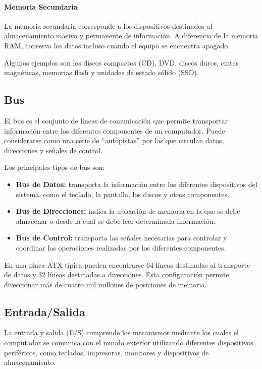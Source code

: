 \documentclass[10pt]{article}
\begin{document}
\paragraph{Memoria Secundaria}

La memoria secundaria corresponde a los dispositivos destinados al almacenamiento masivo y permanente de información. A diferencia de la memoria RAM, conserva los datos incluso cuando el equipo se encuentra apagado.

Algunos ejemplos son los discos compactos (CD), DVD, discos duros, cintas magnéticas, memorias flash y unidades de estado sólido (SSD).

\subsection{Bus}

El bus es el conjunto de líneas de comunicación que permite transportar información entre los diferentes componentes de un computador. Puede considerarse como una serie de ``autopistas'' por las que circulan datos, direcciones y señales de control.

Los principales tipos de bus son:

\begin{itemize}
\item \textbf{Bus de Datos:} transporta la información entre los diferentes dispositivos del sistema, como el teclado, la pantalla, los discos y otros componentes.

\item \textbf{Bus de Direcciones:} indica la ubicación de memoria en la que se debe almacenar o desde la cual se debe leer determinada información.

\item \textbf{Bus de Control:} transporta las señales necesarias para controlar y coordinar las operaciones realizadas por los diferentes componentes.

\end{itemize}

En una placa ATX típica pueden encontrarse 64 líneas destinadas al transporte de datos y 32 líneas destinadas a direcciones. Esta configuración permite direccionar más de cuatro mil millones de posiciones de memoria.

\subsection{Entrada/Salida}

La entrada y salida (E/S) comprende los mecanismos mediante los cuales el computador se comunica con el mundo exterior utilizando diferentes dispositivos periféricos, como teclados, impresoras, monitores y dispositivos de almacenamiento.
\end{document}
